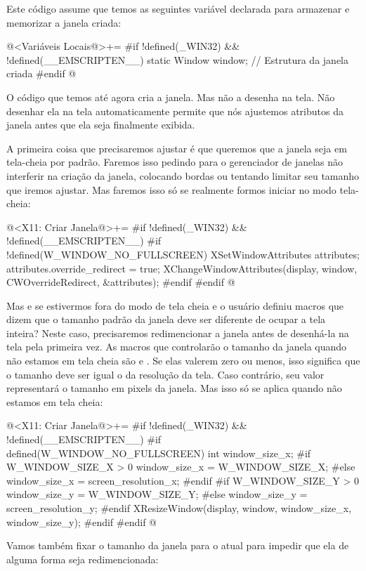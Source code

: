 Este código assume que temos as seguintes variável declarada para
armazenar e memorizar a janela criada:

\iniciocodigo
@<Variáveis Locais@>+=
#if !defined(_WIN32) && !defined(__EMSCRIPTEN__)
static Window window;    // Estrutura da janela criada
#endif
@
\fimcodigo

O código que temos até agora cria a janela. Mas não a desenha na
tela. Não desenhar ela na tela automaticamente permite que nós
ajustemos atributos da janela antes que ela seja finalmente exibida.

A primeira coisa que precisaremos ajustar é que queremos que a janela
seja em tela-cheia por padrão. Faremos isso pedindo para o gerenciador
de janelas não interferir na criação da janela, colocando bordas ou
tentando limitar seu tamanho que iremos ajustar. Mas faremos isso só
se realmente formos iniciar no modo tela-cheia:

\iniciocodigo
@<X11: Criar Janela@>+=
#if !defined(_WIN32) && !defined(__EMSCRIPTEN__)
#if !defined(W_WINDOW_NO_FULLSCREEN)
{
  XSetWindowAttributes attributes;
  attributes.override_redirect = true;
  XChangeWindowAttributes(display, window, CWOverrideRedirect,
                          &attributes);
}
#endif
#endif
@
\fimcodigo

Mas e se estivermos fora do modo de tela cheia e o usuário definiu
macros que dizem que o tamanho padrão da janela deve ser diferente de
ocupar a tela inteira? Neste caso, precisaremos redimencionar a janela
antes de desenhá-la na tela pela primeira vez. As macros que
controlarão o tamanho da janela quando não estamos em tela cheia
são 
e . Se elas valerem zero ou
menos, isso significa que o tamanho deve ser igual o da resolução da
tela. Caso contrário, seu valor representará o tamanho em pixels da
janela. Mas isso só se aplica quando não estamos em tela cheia:

\iniciocodigo
@<X11: Criar Janela@>+=
#if !defined(_WIN32) && !defined(__EMSCRIPTEN__)
#if defined(W_WINDOW_NO_FULLSCREEN)
{
  int window_size_x;
#if W_WINDOW_SIZE_X > 0
  window_size_x = W_WINDOW_SIZE_X;
#else
  window_size_x = screen_resolution_x;
#endif
#if W_WINDOW_SIZE_Y > 0
  window_size_y = W_WINDOW_SIZE_Y;
#else
  window_size_y = screen_resolution_y;
#endif
  XResizeWindow(display, window, window_size_x, window_size_y);  
}
#endif
#endif
@
\fimcodigo

Vamos também fixar o tamanho da janela para o atual para impedir que
ela de alguma forma seja redimencionada:

